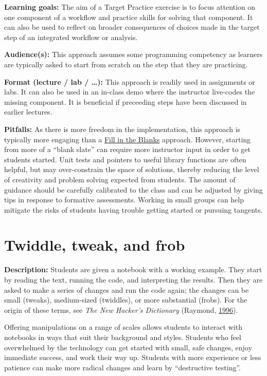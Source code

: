 \documentclass[]{book}
\begin{document}
\textbf{Learning goals:} The aim of a Target Practice exercise is to
focus attention on one component of a workflow and practice skills for
solving that component. It can also be used to reflect on broader
consequences of choices made in the target step of an integrated
workflow or analysis.

\textbf{Audience(s):} This approach assumes some programming competency
as learners are typically asked to start from scratch on the step that
they are practicing.

\textbf{Format (lecture / lab / \ldots{}):} This approach is readily
used in assignments or labs. It can also be used in an in-class demo
where the instructor live-codes the missing component. It is beneficial
if preceeding steps have been discussed in earlier lectures.

\textbf{Pitfalls:} As there is more freedom in the implementation, this
approach is typically more engaging than a
\protect\hyperlink{fill-in-the-blanks}{Fill in the Blanks} approach.
However, starting from more of a ``blank slate'' can require more
instructor input in order to get students started. Unit tests and
pointers to useful library functions are often helpful, but may
over-constrain the space of solutions, thereby reducing the level of
creativity and problem solving expected from students. The amount of
guidance should be carefully calibrated to the class and can be adjusted
by giving tips in response to formative assessments. Working in small
groups can help mitigate the risks of students having trouble getting
started or pursuing tangents.

\section{Twiddle, tweak, and frob}\label{twiddle-tweak-and-frob}

\textbf{Description:} Students are given a notebook with a working
example. They start by reading the text, running the code, and
interpreting the results. Then they are asked to make a series of
changes and run the code again; the changes can be small (tweaks),
medium-sized (twiddles), or more substantial (frobs). For the origin of
these terms, see \emph{The New Hacker's Dictionary} (Raymond,
\protect\hyperlink{ref-raymond1996new}{1996}).

Offering manipulations on a range of scales allows students to interact
with notebooks in ways that suit their background and styles. Students
who feel overwhelmed by the technology can get started with small, safe
changes, enjoy immediate success, and work their way up. Students with
more experience or less patience can make more radical changes and learn
by ``destructive testing''.
\end{document}
